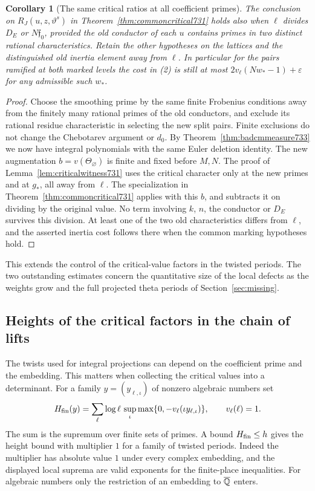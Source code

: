 \documentclass[a4paper,11pt]{article}
\newtheorem{corollary}[proposition]{Corollary}
\theoremstyle{definition}
\theoremstyle{remark}
\numberwithin{equation}{section}
\begin{document}
\begin{corollary}[The same critical ratios at all coefficient primes]
\leavevmode\label{cor:allcritical733}
The conclusion on \(R_J(u,z,\vartheta^s)\) in
Theorem~\ref{thm:commoncritical731} holds also when \(\ell\)
divides \(D_E\) or \(N\mathfrak f_0\), provided the old conductor
of each \(u\) contains primes in two distinct rational
characteristics. Retain the other hypotheses on the lattices and
the distinguished old inertia element away from \(\ell\).
In particular for the pairs ramified at both marked levels the
cost in (2) is still at most
\(2v_\ell(Nw_*-1)+\varepsilon\) for any admissible such \(w_*\).
\end{corollary}
\begin{proof}
Choose the smoothing prime by the same finite Frobenius conditions
away from the finitely many rational primes of the old conductors,
and exclude its rational residue characteristic in selecting the
new split pairs. Finite exclusions do not change the Chebotarev
argument or \(d_0\). By Theorem~\ref{thm:badcmmeasure733} we now
have integral polynomials with the same Euler deletion identity.
The new augmentation \(b=v(\Theta_\varnothing)\) is finite and
fixed before \(M,N\). The proof of
Lemma~\ref{lem:criticalwitness731} uses the critical character only
at the new primes and at \(g_*\), all away from \(\ell\).
The specialization in Theorem~\ref{thm:commoncritical731} applies
with this \(b\), and subtracts it on dividing by the original
value. No term involving \(k\), \(n\), the conductor or \(D_E\)
survives this division. At least one of the two old
characteristics differs from \(\ell\), and the asserted inertia
cost follows there when the common marking hypotheses hold.
\end{proof}

This extends the control of the critical-value factors in the
twisted periods. The two outstanding estimates concern the
quantitative size of the local defects as the weights grow and
the full projected theta periods of Section~\ref{sec:missing}.
\clearpage

\subsection{Heights of the critical factors in the chain of lifts}
\label{sec:criticalheights734}

The twists used for integral projections can depend on the coefficient
prime and the embedding. This matters when collecting the critical
values into a determinant. For a family \(y=(y_{\ell,\iota})\) of
nonzero algebraic numbers set
\[
 H_{\rm fin}(y)=\sum_{\ell}\log\ell\,
        \sup_\iota\max\{0,-v_\ell(\iota y_{\ell,\iota})\},
             \qquad v_\ell(\ell)=1 .
\]
The sum is the supremum over finite sets of primes. A bound \(H_{\rm fin}
\le h\) gives the height bound with multiplier \(1\) for a family of
twisted periods. Indeed the multiplier has absolute value \(1\) under
every complex embedding, and the displayed local suprema are valid
exponents for the finite-place inequalities. For algebraic numbers
only the restriction of an embedding to \(\overline{\mathbb Q}\) enters.
\end{document}
